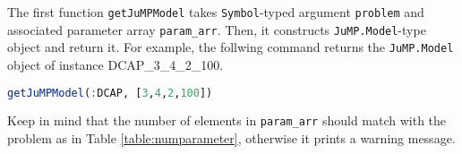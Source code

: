 The first function \texttt{getJuMPModel} takes \texttt{Symbol}-typed argument \texttt{problem} and associated parameter array \texttt{param\_arr}. Then, it constructs \texttt{JuMP.Model}-type object and return it. For example, the follwing command returns the \texttt{JuMP.Model} object of instance DCAP\_3\_4\_2\_100.
\begin{lstlisting}[frame=single,language=julia]
getJuMPModel(:DCAP, [3,4,2,100])
\end{lstlisting}
Keep in mind that the number of elements in \texttt{param\_arr} should match with the problem as in Table \ref{table:numparameter}, otherwise it prints a warning message.

\begin{table}[h]
	\centering
	\caption{\texttt{problem} arguments and corresponding parameter array}
	\label{table:numparameter}
\end{table}

